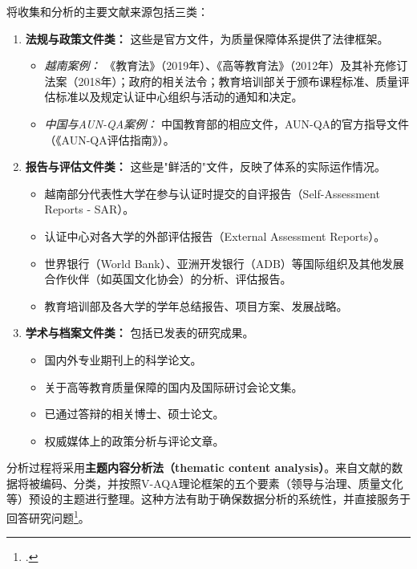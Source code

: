将收集和分析的主要文献来源包括三类：
\begin{enumerate}
    \item \textbf{法规与政策文件类：} 这些是官方文件，为质量保障体系提供了法律框架。
    \begin{itemize}
        \item \textit{越南案例：} 《教育法》（2019年）、《高等教育法》（2012年）及其补充修订法案（2018年）；政府的相关法令；教育培训部关于颁布课程标准、质量评估标准以及规定认证中心组织与活动的通知和决定。
        \item \textit{中国与AUN-QA案例：} 中国教育部的相应文件，AUN-QA的官方指导文件（《AUN-QA评估指南》）。
    \end{itemize}
    
    \item \textbf{报告与评估文件类：} 这些是"鲜活的"文件，反映了体系的实际运作情况。
    \begin{itemize}
        \item 越南部分代表性大学在参与认证时提交的自评报告（Self-Assessment Reports - SAR）。
        \item 认证中心对各大学的外部评估报告（External Assessment Reports）。
        \item 世界银行（World Bank）、亚洲开发银行（ADB）等国际组织及其他发展合作伙伴（如英国文化协会）的分析、评估报告。
        \item 教育培训部及各大学的学年总结报告、项目方案、发展战略。
    \end{itemize}
    
    \item \textbf{学术与档案文件类：} 包括已发表的研究成果。
    \begin{itemize}
        \item 国内外专业期刊上的科学论文。
        \item 关于高等教育质量保障的国内及国际研讨会论文集。
        \item 已通过答辩的相关博士、硕士论文。
        \item 权威媒体上的政策分析与评论文章。
    \end{itemize}
\end{enumerate}

分析过程将采用\textbf{主题内容分析法（thematic content analysis）}。来自文献的数据将被编码、分类，并按照V-AQA理论框架的五个要素（领导与治理、质量文化等）预设的主题进行整理。这种方法有助于确保数据分析的系统性，并直接服务于回答研究问题\footcite{BraunClarke2006}。


